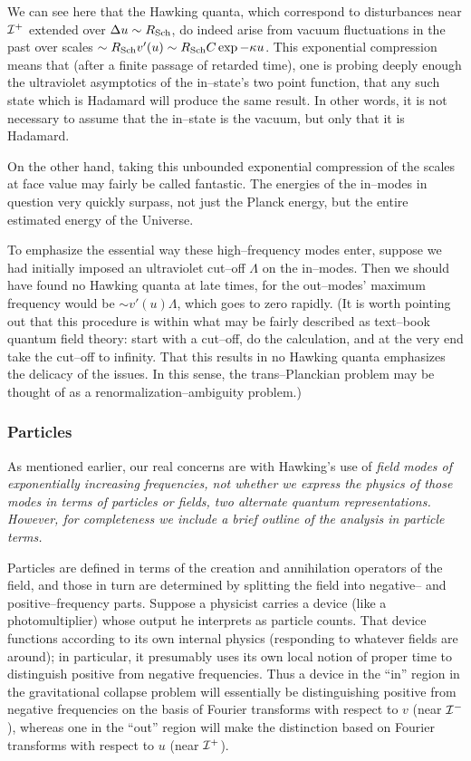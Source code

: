 We can see here that the Hawking quanta, which correspond to disturbances near
${\cal I} ^+$ extended over $\Delta u\sim R_{\rm Sch}$, do indeed arise
from vacuum
fluctuations in the past over scales 
$\sim R_{\rm Sch}v'(u)\sim R_{\rm Sch}C\exp
-\kappa u$.  
This exponential compression means that (after a finite passage of
retarded time), one is probing deeply enough the ultraviolet
asymptotics of the in--state's two point function, that any such state
which is Hadamard will produce the same result.  In other words, it is
not necessary to assume that the in--state is the vacuum, but only
that it is Hadamard.

On the other hand, taking this unbounded exponential compression of
the scales at face value may fairly be called fantastic.  The energies
of the in--modes in question very quickly surpass, not just the Planck
energy, but the entire estimated energy of the Universe.

To emphasize the essential way these high--frequency modes enter, suppose we had
initially imposed an ultraviolet cut--off $\Lambda$ on the in--modes.  Then we
should have found no Hawking quanta at late times, for the out--modes' maximum
frequency would be $\sim v'(u)\Lambda$, which goes to zero rapidly.  
(It is worth pointing out that this procedure is within what may be fairly
described as text--book quantum field theory:  start with a cut--off, do the
calculation, and at the very end take the cut--off to infinity.  That this
results in no Hawking quanta emphasizes the delicacy of the issues.  In this
sense, the trans--Planckian problem may be thought of as a
renormalization--ambiguity problem.)


\subsubsection{Particles}

As mentioned earlier, our real concerns are with Hawking's use of \it field
modes \rm of exponentially increasing frequencies, not whether we express the
physics of those modes in terms of particles or fields, two alternate quantum
representations.  However, for completeness we include a brief outline of the
analysis in particle terms.

Particles are defined in terms of the creation and annihilation operators of the
field, and those in turn are determined by splitting the field into negative--
and positive--frequency parts.  Suppose a physicist carries a device (like a
photomultiplier) whose output he interprets as particle counts.  That device
functions according to its own internal physics (responding to whatever fields
are around); in particular, it presumably uses its own local notion of proper
time to distinguish positive from negative frequencies.  Thus a device in the
``in'' region in the gravitational collapse problem will essentially be
distinguishing positive from negative frequencies on the basis of Fourier
transforms with respect to $v$ (near ${\cal I} ^-$), whereas one in the ``out''
region will make the distinction based on Fourier transforms with respect to $u$
(near ${\cal I} ^+$).  

